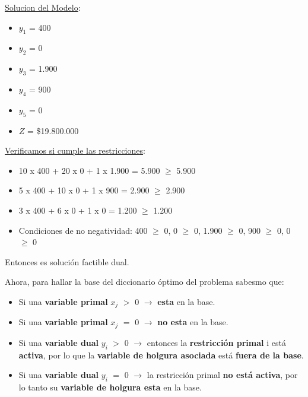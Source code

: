 \documentclass[10pt,a4paper]{article}
\begin{document}
\begin{enumerate}
\begin{itemize}
    \end{itemize}

    \underline{Solucion del Modelo}: 

    \begin{itemize}

        \item $y_{1}$ = 400
        \item $y_{2}$ = 0
        \item $y_{3}$ = 1.900
        \item $y_{4}$ = 900
        \item $y_{5}$ = 0
        \item $Z$ = \$19.800.000\\

    \end{itemize}

    \underline{Verificamos si cumple las restricciones}:

    \begin{itemize}

        \item 10 x 400 + 20 x 0 + 1 x 1.900 = 5.900 $\geq$ 5.900
        \item 5 x 400 + 10 x 0 + 1 x 900 = 2.900 $\geq$ 2.900
        \item 3 x 400 + 6 x 0 + 1 x 0 = 1.200 $\geq$ 1.200
        \item Condiciones de no negatividad: 400 $\geq$ 0, 0 $\geq$ 0, 1.900 $\geq$ 0, 900 $\geq$ 0, 0 $\geq$ 0\\

    \end{itemize}

    Entonces es solución factible dual.\\

    \clearpage

    Ahora, para hallar la base del diccionario óptimo del problema sabesmo que:

    \begin{itemize}

        \item Si una \textbf{variable primal} $x_{j}$ $>$ 0 $\rightarrow$ \textbf{esta} en la base.
        \item Si una \textbf{variable primal} $x_{j}$ $=$ 0 $\rightarrow$ \textbf{no esta} en la base.
        \item Si una \textbf{variable dual} $y_{i}$ $>$ 0 $\rightarrow$  entonces la \textbf{restricción primal} 
        i está \textbf{activa}, por lo que la \textbf{variable de holgura asociada} está \textbf{fuera de la base}.
        \item Si una \textbf{variable dual} $y_{i}$ $=$ 0 $\rightarrow$  la restricción primal \textbf{no está activa}, por lo tanto su \textbf{variable de 
        holgura  esta} en la base. \\


\end{itemize}
\end{enumerate}
\end{document}
